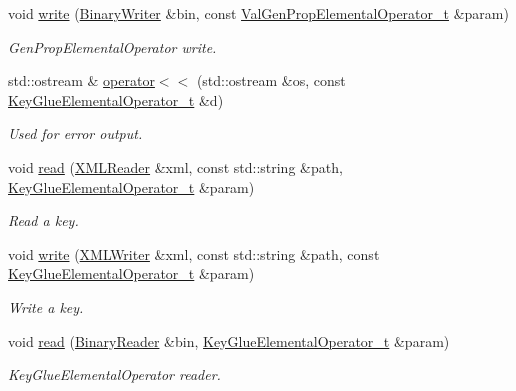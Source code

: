 \begin{DoxyCompactItemize}
void \mbox{\hyperlink{namespaceHadron_a276bd4448f8f6233aa951856e912651e}{write}} (\mbox{\hyperlink{classADATIO_1_1BinaryWriter}{Binary\+Writer}} \&bin, const \mbox{\hyperlink{structHadron_1_1ValGenPropElementalOperator__t}{Val\+Gen\+Prop\+Elemental\+Operator\+\_\+t}} \&param)
\begin{DoxyCompactList}\small\item\em Gen\+Prop\+Elemental\+Operator write. \end{DoxyCompactList}\item 
std\+::ostream \& \mbox{\hyperlink{namespaceHadron_a04ae91286afb27f277e2c61cd6a77b8a}{operator$<$$<$}} (std\+::ostream \&os, const \mbox{\hyperlink{structHadron_1_1KeyGlueElementalOperator__t}{Key\+Glue\+Elemental\+Operator\+\_\+t}} \&d)
\begin{DoxyCompactList}\small\item\em Used for error output. \end{DoxyCompactList}\item 
void \mbox{\hyperlink{namespaceHadron_a0651834c5f37836ea0e1e081b4214546}{read}} (\mbox{\hyperlink{classADATXML_1_1XMLReader}{X\+M\+L\+Reader}} \&xml, const std\+::string \&path, \mbox{\hyperlink{structHadron_1_1KeyGlueElementalOperator__t}{Key\+Glue\+Elemental\+Operator\+\_\+t}} \&param)
\begin{DoxyCompactList}\small\item\em Read a key. \end{DoxyCompactList}\item 
void \mbox{\hyperlink{namespaceHadron_a4ae7852bf18d56cb1a966ce318245ea6}{write}} (\mbox{\hyperlink{classADATXML_1_1XMLWriter}{X\+M\+L\+Writer}} \&xml, const std\+::string \&path, const \mbox{\hyperlink{structHadron_1_1KeyGlueElementalOperator__t}{Key\+Glue\+Elemental\+Operator\+\_\+t}} \&param)
\begin{DoxyCompactList}\small\item\em Write a key. \end{DoxyCompactList}\item 
void \mbox{\hyperlink{namespaceHadron_a008c27a4777be30324acc6271e059d2e}{read}} (\mbox{\hyperlink{classADATIO_1_1BinaryReader}{Binary\+Reader}} \&bin, \mbox{\hyperlink{structHadron_1_1KeyGlueElementalOperator__t}{Key\+Glue\+Elemental\+Operator\+\_\+t}} \&param)
\begin{DoxyCompactList}\small\item\em Key\+Glue\+Elemental\+Operator reader. \end{DoxyCompactList}\item 

\end{DoxyCompactItemize}
